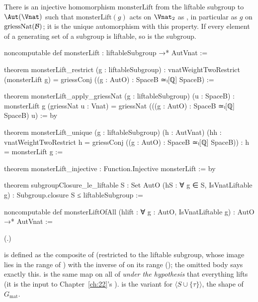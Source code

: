 \begin{theorem}\label{ch21:thm:monsterLift}
There is an injective homomorphism $\mathrm{monsterLift}$ from the liftable subgroup to $\Aut(\Vnat)$
such that $\mathrm{monsterLift}(g)$ acts on $\Vnat_2$ as , in particular as $g$ on
$\mathrm{griessNat}(\mathcal{B})$; it is the unique automorphism with this property.  If every element of
a generating set of a subgroup is liftable, so is the subgroup.
\end{theorem}
\begin{leancode}
noncomputable def monsterLift : liftableSubgroup →* AutVnat :=
\end{leancode}
\begin{leancode}
theorem monsterLift_restrict (g : liftableSubgroup) :
    vnatWeightTwoRestrict (monsterLift g) = griessConj ((g : AutO) : SpaceB ≃ₗ[ℚ] SpaceB) :=
\end{leancode}
\begin{leancode}
theorem monsterLift_apply_griessNat (g : liftableSubgroup) (u : SpaceB) :
    monsterLift g (griessNat u : Vnat) = griessNat (((g : AutO) : SpaceB ≃ₗ[ℚ] SpaceB) u) := by
\end{leancode}
\begin{leancode}
theorem monsterLift_unique (g : liftableSubgroup) (h : AutVnat)
    (hh : vnatWeightTwoRestrict h = griessConj ((g : AutO) : SpaceB ≃ₗ[ℚ] SpaceB)) :
    h = monsterLift g :=
\end{leancode}
\begin{leancode}
theorem monsterLift_injective : Function.Injective monsterLift := by
\end{leancode}
\begin{leancode}
theorem subgroupClosure_le_liftable {S : Set AutO} (hS : ∀ g ∈ S, IsVnatLiftable g) :
    Subgroup.closure S ≤ liftableSubgroup :=
\end{leancode}
\begin{leancode}
noncomputable def monsterLiftOfAll (hlift : ∀ g : AutO, IsVnatLiftable g) : AutO →* AutVnat :=
\end{leancode}
(.)
\begin{dictionary}
 is defined as the composite of  (restricted to the liftable subgroup,
whose image lies in the range of ) with the inverse of
 on its range (); the omitted body says exactly
this.   is the same map on all of  \emph{under the hypothesis}
 that everything lifts (it is the input to Chapter~\ref{ch:22}'s ).
 is the variant for $\langle S\cup\{\tau\}\rangle$, the shape of
$G_{\mathrm{mat}}$.
\end{dictionary}
